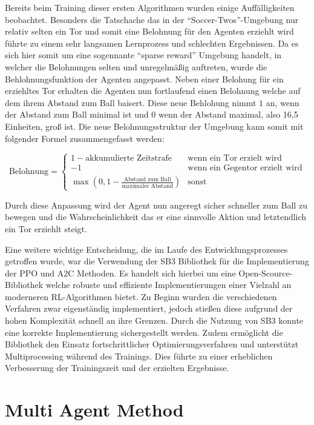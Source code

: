 Bereits beim Training dieser ersten Algorithmen wurden einige Auffälligkeiten beobachtet. Besonders die Tatschache das in der ``Soccer-Twos''-Umgebung nur relativ selten ein Tor und somit eine Belohnung für den Agenten erziehlt wird führte zu einem sehr langsamen Lernprozess und schlechten Ergebnissen. Da es sich hier somit um eine sogennante ``sparse reward'' Umgebung handelt, in welcher die Belohnungen selten und unregelmäßig auftreten, wurde die Behlohnungsfunktion der Agenten angepasst. Neben einer Belohung für ein erziehltes Tor erhalten die Agenten nun fortlaufend einen Belohnung welche auf dem ihrem Abstand zum Ball baisert. Diese neue Behlohung nimmt \(1\) an, wenn der Abstand zum Ball minimal ist und \(0\) wenn der Abstand maximal, also 16,5 Einheiten, groß ist. Die neue Belohnungsstruktur der Umgebung kann somit mit folgender Formel zusammengefasst werden:

\[
\text{Belohnung} = \begin{cases} 
	1 - \text{akkumulierte Zeitstrafe} & \text{wenn ein Tor erzielt wird} \\
	-1 & \text{wenn ein Gegentor erzielt wird} \\
	\max\left(0, 1 - \frac{\text{Abstand zum Ball}}{\text{maximaler Abstand}}\right) & \text{sonst}
\end{cases}
\]

Durch diese Anpassung wird der Agent nun angeregt sicher schneller zum Ball zu bewegen und die Wahrscheinlichkeit das er eine sinnvolle Aktion und letztendlich ein Tor erziehlt steigt.

Eine weitere wichtige Entscheidung, die im Laufe des Entwicklungsprozesses getroffen wurde, war die Verwendung der \ac{SB3} Bibliothek \cite{stable-baselines3} für die Implementierung der \ac{PPO} und \ac{A2C} Methoden. Es handelt sich hierbei um eine Open-Scource-Bibliothek welche robuste und effiziente Implementierungen einer Vielzahl an moderneren \ac{RL}-Algorithmen bietet.
Zu Beginn wurden die verschiedenen Verfahren zwar eigenständig implementiert, jedoch stießen diese aufgrund der hohen Komplexität schnell an ihre Grenzen. Durch die Nutzung von \ac{SB3} konnte eine korrekte Implementierung sichergestellt werden. Zudem ermöglicht die Bibliothek den Einsatz fortschrittlicher Optimierungsverfahren und unterstützt Multiprocessing während des Trainings. Dies führte zu einer erheblichen Verbesserung der Trainingszeit und der erzielten Ergebnisse.

\section{Multi Agent Method}

